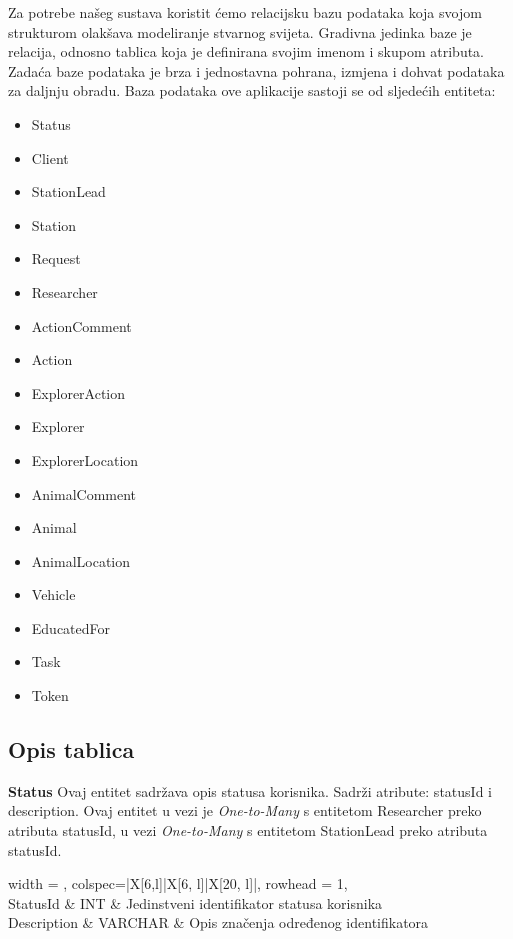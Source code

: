 			
			
		Za potrebe našeg sustava koristit ćemo relacijsku bazu podataka koja svojom strukturom olakšava modeliranje stvarnog svijeta. Gradivna jedinka baze je relacija, odnosno tablica koja je definirana svojim imenom i skupom atributa. Zadaća baze podataka je brza i jednostavna pohrana, izmjena i dohvat podataka za daljnju obradu.
		Baza podataka ove aplikacije sastoji se od sljedećih entiteta:
		\begin{itemize}
			\item Status
			\item Client
			\item StationLead
			\item Station
			\item Request
			\item Researcher
			\item ActionComment
			\item Action
			\item ExplorerAction
			\item Explorer
			\item ExplorerLocation
			\item AnimalComment
			\item Animal
			\item AnimalLocation
			\item Vehicle
			\item EducatedFor
			\item Task
			\item Token
		\end{itemize}
		
			\subsection{Opis tablica}
				
				\textbf{Status} Ovaj entitet sadržava opis statusa korisnika. Sadrži atribute: statusId i description. Ovaj entitet u vezi je \textit{One-to-Many} s entitetom Researcher preko atributa statusId, u vezi \textit{One-to-Many} s entitetom StationLead preko atributa statusId.
				\begin{longtblr}[
					label=none,
					entry=none
					]{
						width = \textwidth,
						colspec={|X[6,l]|X[6, l]|X[20, l]|}, 
						rowhead = 1,
					} %
					\hline {}	 \\ \hline[3pt]
					StatusId & INT	&  	Jedinstveni identifikator statusa korisnika	\\ \hline
					Description	& VARCHAR &   Opis značenja određenog identifikatora	\\ \hline
				\end{longtblr}
				
